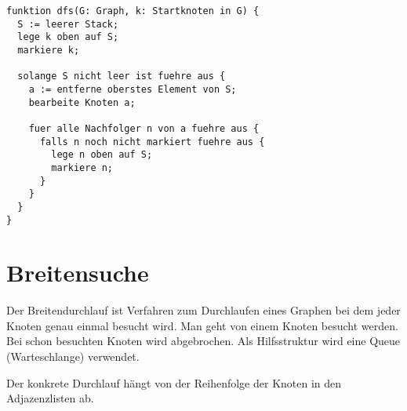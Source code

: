 \documentclass{lehramt-informatik-haupt}
\begin{document}
\begin{verbatim}
funktion dfs(G: Graph, k: Startknoten in G) {
  S := leerer Stack;
  lege k oben auf S;
  markiere k;

  solange S nicht leer ist fuehre aus {
    a := entferne oberstes Element von S;
    bearbeite Knoten a;

    fuer alle Nachfolger n von a fuehre aus {
      falls n noch nicht markiert fuehre aus {
        lege n oben auf S;
        markiere n;
      }
    }
  }
}
\end{verbatim}


%

\section{Breitensuche}

\begin{liQuellen}
\item \cite[Seite 53-64 (PDF 46-57)]{aud:fs:6}
\item \cite[Kapitel 6.2.2.2 Graphalgorithmen, Seite 185]{schneider}
\end{liQuellen}

Der Breitendurchlauf ist Verfahren zum Durchlaufen eines Graphen bei dem
jeder Knoten genau einmal besucht wird. Man geht von einem Knoten
  besucht
werden. Bei schon besuchten Knoten wird abgebrochen. Als Hilfsstruktur
wird eine Queue (Warteschlange) verwendet.

Der konkrete Durchlauf hängt von der Reihenfolge der Knoten in den
Adjazenzlisten ab.

\TmpGraph
\end{document}
